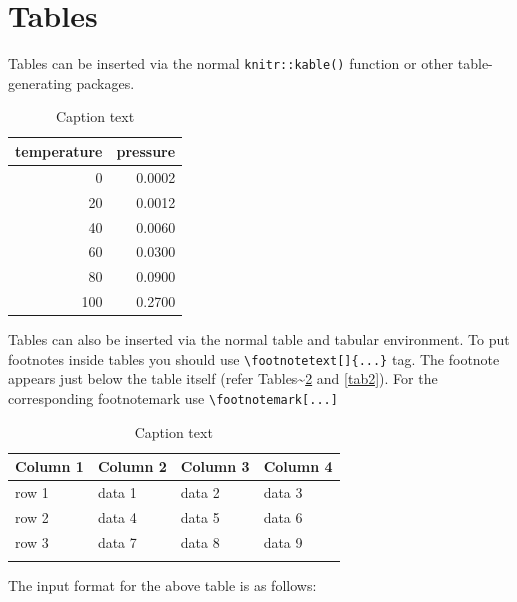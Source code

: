 \documentclass[sn-basic,pdflatex]{sn-jnl}
\theoremstyle{remark}
\theoremstyle{definition}
\begin{document}
\hypertarget{sec5}{%
\section{Tables}\label{sec5}}

Tables can be inserted via the normal \texttt{knitr::kable()} function
or other table-generating packages.

\begin{table}

\caption{\label{tab:tab1}Caption text}
\centering
\begin{tabular}[t]{r|r}
\hline
temperature & pressure\\
\hline
0 & 0.0002\\
\hline
20 & 0.0012\\
\hline
40 & 0.0060\\
\hline
60 & 0.0300\\
\hline
80 & 0.0900\\
\hline
100 & 0.2700\\
\hline
\end{tabular}
\end{table}

Tables can also be inserted via the normal table and tabular
environment. To put footnotes inside tables you should use
\texttt{\textbackslash{}footnotetext{[}{]}\{...\}} tag. The footnote
appears just below the table itself (refer
Tables\textasciitilde{}\ref{tab1} and \ref{tab2}). For the corresponding
footnotemark use \texttt{\textbackslash{}footnotemark{[}...{]}}

\begin{table}[h]
\caption{Caption text}\label{tab1}%
\begin{tabular}{@{}llll@{}}
\toprule
Column 1 & Column 2  & Column 3 & Column 4\\
\midrule
row 1    & data 1   & data 2  & data 3  \\
row 2    & data 4   & data 5\footnotemark[1]  & data 6  \\
row 3    & data 7   & data 8  & data 9\footnotemark[2]  \\
\botrule
\end{tabular}
\end{table}

\noindent The input format for the above table is as follows:
\end{document}
